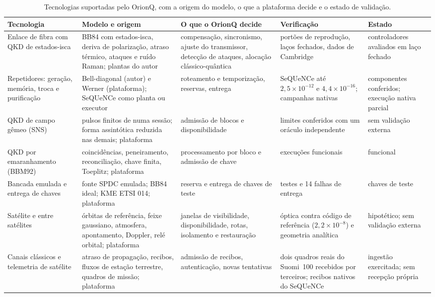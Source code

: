 \documentclass[12pt]{article}
\providecommand{\citeasnoun}[1]{\cite{#1}}
\begin{document}
\begin{table}[ht]
\centering
\caption{Tecnologias suportadas pelo OrionQ, com a origem do modelo, o que a
plataforma decide e o estado de validação.}
\label{tab:tecnologias}
\scriptsize
\setlength{\tabcolsep}{3pt}
\begin{tabular}{>{\raggedright\arraybackslash}p{2.3cm}>{\raggedright\arraybackslash}p{3.3cm}>{\raggedright\arraybackslash}p{3.2cm}>{\raggedright\arraybackslash}p{3.0cm}>{\raggedright\arraybackslash}p{2.0cm}}
\toprule
Tecnologia & Modelo e origem & O que o OrionQ decide & Verificação & Estado \\
\midrule
Enlace de fibra com QKD de estados-isca & BB84 com estados-isca, deriva de polarização, atraso térmico, ataques e ruído Raman; plantas do autor & compensação, sincronismo, ajuste do transmissor, detecção de ataques, alocação clássico-quântica & portões de reprodução, laços fechados, dados de Cambridge & controladores avaliados em laço fechado \\
Repetidores: geração, memória, troca e purificação & Bell-diagonal (autor) e Werner (plataforma); SeQUeNCe como planta ou executor & roteamento e temporização, reservas, entrega & SeQUeNCe até $2{,}5\times10^{-12}$ e $4{,}4\times10^{-16}$; campanhas nativas & componentes conferidos; execução nativa parcial \\
QKD de campo gêmeo (SNS) & pulsos finitos de \citeasnoun{jiang2019} numa sessão; forma assintótica reduzida nas demais; plataforma & admissão de blocos e disponibilidade & limites conferidos com um oráculo independente & sem validação externa \\
QKD por emaranhamento (BBM92) & coincidências, peneiramento, reconciliação, chave finita, Toeplitz; plataforma & processamento por bloco e admissão de chave & execuções funcionais & funcional \\
Bancada emulada e entrega de chaves & fonte SPDC emulada; BB84 ideal; KME ETSI 014; plataforma & reserva e entrega de chaves de teste & 49 testes e 14 falhas de entrega & chaves de teste \\
Satélite e entre satélites & órbitas de referência, feixe gaussiano, atmosfera, apontamento, Doppler, relé orbital; plataforma & janelas de visibilidade, disponibilidade, rotas, isolamento e restauração & óptica contra código de referência ($2{,}2\times10^{-8}$) e geometria analítica & hipotético; sem validação externa \\
Canais clássicos e telemetria de satélite & atraso de propagação, recibos, fluxos de estação terrestre, quadros de missão; plataforma & admissão de recibos, autenticação, novas tentativas & dois quadros reais do Suomi~100 recebidos por terceiros; recibos nativos do SeQUeNCe & ingestão exercitada; sem recepção própria \\
\bottomrule
\end{tabular}
\end{table}
\end{document}
